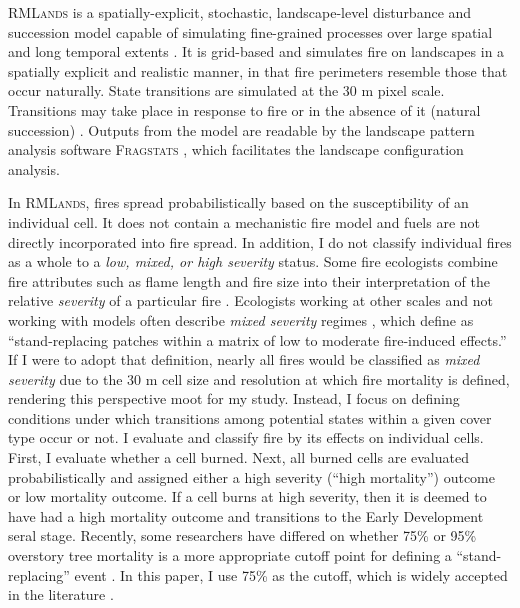 \textsc{RMLands} is a spatially-explicit, stochastic, landscape-level disturbance and succession model capable of simulating fine-grained processes over large spatial and long temporal extents \citep{McGarigal2005}. It is grid-based and simulates fire on landscapes in a spatially explicit and realistic manner, in that fire perimeters resemble those that occur naturally. State transitions are simulated at the 30 m pixel scale. Transitions may take place in response to fire or in the absence of it (natural succession) \citep{McGarigal2012}. Outputs from the model are readable by the landscape pattern analysis software \textsc{Fragstats} \citep{Fragstats2012}, which facilitates the landscape configuration analysis.

In \textsc{RMLands}, fires spread probabilistically based on the susceptibility of an individual cell. It does not contain a mechanistic fire model and fuels are not directly incorporated into fire spread. In addition, I do not classify individual fires as a whole to a \emph{low, mixed, or high severity} status. Some fire ecologists combine fire attributes such as flame length and fire size into their interpretation of the relative \emph{severity} of a particular fire \citep{Agee1993}. Ecologists working at other scales and not working with models often describe \emph{mixed severity} regimes \citep[e.g.,][]{Kane2013}, which \citet{Collins2010} define as ``stand-replacing patches within a matrix of low to moderate fire-induced effects.'' If I were to adopt that definition, nearly all fires would be classified as \emph{mixed severity} due to the 30 m cell size and resolution at which fire mortality is defined, rendering this perspective moot for my study. Instead, I focus on defining conditions under which transitions among potential states within a given cover type occur or not. I evaluate and classify fire by its effects on individual cells. First, I evaluate whether a cell burned. Next, all burned cells are evaluated probabilistically and assigned either a high severity (``high mortality'') outcome or low mortality outcome. If a cell burns at high severity, then it is deemed to have had a high mortality outcome and transitions to the Early Development seral stage. Recently, some researchers have differed on whether 75\% or 95\% overstory tree mortality is a more appropriate cutoff point for defining a ``stand-replacing'' event \citep{Fule2014,Mallek2013}. In this paper, I use 75\% as the cutoff, which is widely accepted in the literature \citep{Agee1993,Agee2007,Miller2009,Baker2014}.

